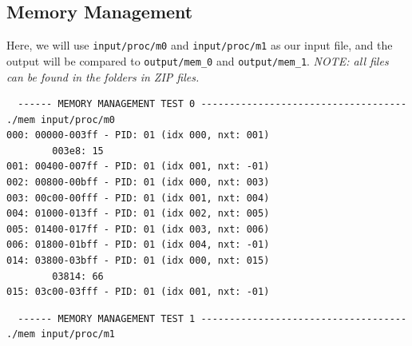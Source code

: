 \documentclass[a4paper]{article}
\numberwithin{equation}{section}
\begin{document}
\subsection{Memory Management}
Here, we will use \texttt{input/proc/m0} and \texttt{input/proc/m1} as our input file, and the output will be compared to \texttt{output/mem_0} and \texttt{output/mem_1}.
\textit{NOTE: all files can be found in the folders in ZIP files.}
\begin{mdframed}[leftline=false,rightline=false,backgroundcolor=grey!10,nobreak=false]
  \begin{verbatim}
  ------ MEMORY MANAGEMENT TEST 0 ------------------------------------
./mem input/proc/m0
000: 00000-003ff - PID: 01 (idx 000, nxt: 001)
        003e8: 15
001: 00400-007ff - PID: 01 (idx 001, nxt: -01)
002: 00800-00bff - PID: 01 (idx 000, nxt: 003)
003: 00c00-00fff - PID: 01 (idx 001, nxt: 004)
004: 01000-013ff - PID: 01 (idx 002, nxt: 005)
005: 01400-017ff - PID: 01 (idx 003, nxt: 006)
006: 01800-01bff - PID: 01 (idx 004, nxt: -01)
014: 03800-03bff - PID: 01 (idx 000, nxt: 015)
        03814: 66
015: 03c00-03fff - PID: 01 (idx 001, nxt: -01)
  \end{verbatim}
\end{mdframed}

\begin{mdframed}[leftline=false,rightline=false,backgroundcolor=grey!10,nobreak=false]
  \begin{verbatim}
  ------ MEMORY MANAGEMENT TEST 1 ------------------------------------
./mem input/proc/m1
  \end{verbatim}
\end{mdframed}
\end{document}

